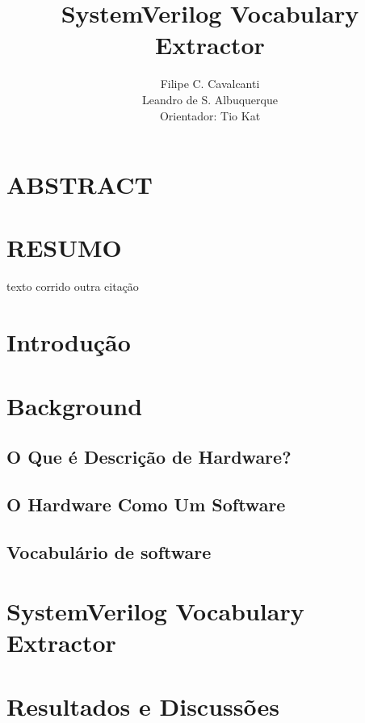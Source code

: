 \documentclass[12pt, twocolumn, a4paper]{article}
\begin{document}
	\title{SystemVerilog Vocabulary Extractor}
	\author{Filipe C. Cavalcanti\\ Leandro de S. Albuquerque\\
	Orientador: Tio Kat}
	\maketitle
	
	\section{ABSTRACT}
	
	\section{RESUMO}
	texto corrido\cite{Antoniol2007}
	outra citação\cite{Alfke1943}
	\section{Introdução}
	\section{Background}
	\subsection{O Que é Descrição de Hardware?}
	\subsection{O Hardware Como Um Software}
	\subsection{Vocabulário de software}
	\section{SystemVerilog Vocabulary Extractor}
	\section{Resultados e Discussões}
	
\end{document}
